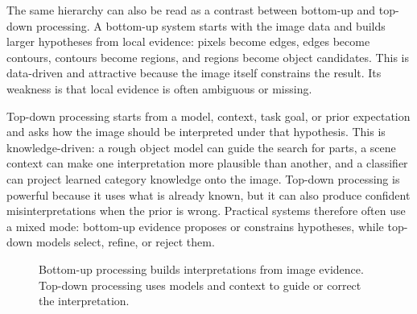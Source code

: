 \noindent
The same hierarchy can also be read as a contrast between bottom-up and
top-down processing. A bottom-up system starts with the image data and builds
larger hypotheses from local evidence: pixels become edges, edges become
contours, contours become regions, and regions become object candidates. This
is data-driven and attractive because the image itself constrains the result.
Its weakness is that local evidence is often ambiguous or missing.

Top-down processing starts from a model, context, task goal, or prior
expectation and asks how the image should be interpreted under that hypothesis.
This is knowledge-driven: a rough object model can guide the search for parts,
a scene context can make one interpretation more plausible than another, and a
classifier can project learned category knowledge onto the image. Top-down
processing is powerful because it uses what is already known, but it can also
produce confident misinterpretations when the prior is wrong. Practical systems
therefore often use a mixed mode: bottom-up evidence proposes or constrains
hypotheses, while top-down models select, refine, or reject them.

\begin{figure}[ht]
  \centering
  \caption{Bottom-up processing builds interpretations from image evidence.
  Top-down processing uses models and context to guide or correct the
  interpretation.}
\end{figure}

